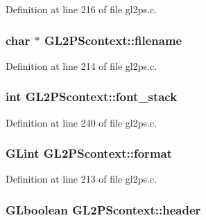 Definition at line 216 of file gl2ps.\+c.

\hypertarget{struct_g_l2_p_scontext_abf0ec2a3907593fd0be11b6c2c297432}{}
\subsubsection[{filename}]{\setlength{\rightskip}{0pt plus 5cm}char $\ast$ G\+L2\+P\+Scontext\+::filename}\label{struct_g_l2_p_scontext_abf0ec2a3907593fd0be11b6c2c297432}


Definition at line 214 of file gl2ps.\+c.

\hypertarget{struct_g_l2_p_scontext_a69779f964edcdd9fc734f7e301328363}{}
\subsubsection[{font\+\_\+stack}]{\setlength{\rightskip}{0pt plus 5cm}int G\+L2\+P\+Scontext\+::font\+\_\+stack}\label{struct_g_l2_p_scontext_a69779f964edcdd9fc734f7e301328363}


Definition at line 240 of file gl2ps.\+c.

\hypertarget{struct_g_l2_p_scontext_a32c2cf3724d6bd19e23e2eee3e5df327}{}
\subsubsection[{format}]{\setlength{\rightskip}{0pt plus 5cm}G\+Lint G\+L2\+P\+Scontext\+::format}\label{struct_g_l2_p_scontext_a32c2cf3724d6bd19e23e2eee3e5df327}


Definition at line 213 of file gl2ps.\+c.

\hypertarget{struct_g_l2_p_scontext_adaf1a843b0de36775c88f09e9814816d}{}
\subsubsection[{header}]{\setlength{\rightskip}{0pt plus 5cm}G\+Lboolean G\+L2\+P\+Scontext\+::header}\label{struct_g_l2_p_scontext_adaf1a843b0de36775c88f09e9814816d}


